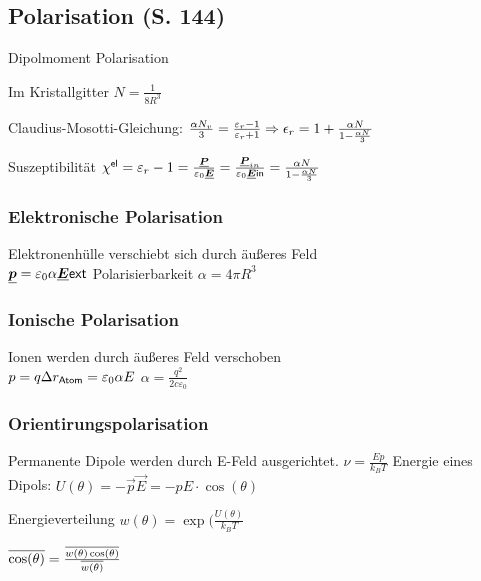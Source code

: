 \documentclass[fs, footer]{latex4ei}
\begin{document}
\begin{multicols*}{4}
{	\subsection{Polarisation (S. 144)}

	Dipolmoment  \qquad Polarisation 
	
	Im Kristallgitter $ N = \frac{1}{8 R^3}$
	
	Claudius-Mosotti-Gleichung: $\frac{\alpha N_v}{3} = \frac{\varepsilon_r -1}{\varepsilon_r +1} \Rightarrow  \epsilon_r = 1 + \frac{\alpha N}{1 - \frac{\alpha N }{3}}$
	
	Suszeptibilität $\chi^{\sf el} = \varepsilon_r - 1 = \frac{\underline{\boldsymbol {P}}}{\varepsilon_0 \underline{\boldsymbol {E}}} = \frac{\underline{\boldsymbol {P}}_{in}}{\varepsilon_0 \underline{\boldsymbol {E}}{\sf in}} = \frac{\alpha N}{1- \frac{\alpha N}{3}}$

	\subsubsection*{Elektronische Polarisation} Elektronenhülle verschiebt sich durch äußeres Feld\\
	$\underline{\boldsymbol {p}} = \varepsilon_0 \alpha \underline{\boldsymbol {E}}{\sf ext}$ \qquad Polarisierbarkeit $\alpha = 4\pi R^3$
	
	\subsubsection*{Ionische Polarisation} Ionen werden durch äußeres Feld verschoben\\
	$p = q \Delta r_{\sf Atom} = \varepsilon_0 \alpha E$ \qquad $\alpha = \frac{q^2}{2c \varepsilon_0}$
	
	\subsubsection*{Orientirungspolarisation} Permanente Dipole werden durch E-Feld ausgerichtet.
	$\nu = \frac{E p}{k_B T}$
	Energie eines Dipols: $U(\theta) = -\vec p \vec E = -pE \cdot \cos(\theta)$
	 
	Energieverteilung $w(\theta) = \exp(\frac{U(\theta)}{k_B T}$
	
	$\overline{\cos(\theta)} = \frac{\overline{w(\theta) \cos(\theta)}}{\overline{w(\theta)}}$
	
}



\end{multicols*}
\end{document}
